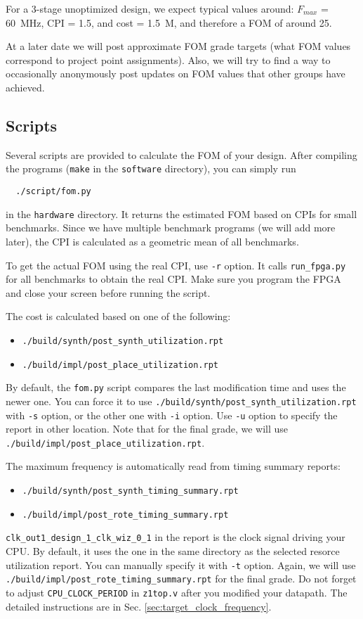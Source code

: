 For a 3-stage unoptimized design, we expect typical values around: $F_{max}$ = 60~MHz, CPI = 1.5, and cost = 1.5~M, and therefore a FOM of around 25.

At a later date we will post approximate FOM grade targets (what FOM values correspond to project point assignments).
Also, we will try to find a way to occasionally anonymously post updates on FOM values that other groups have achieved.


\subsection{Scripts}
Several scripts are provided to calculate the FOM of your design.
After compiling the programs (\verb|make| in the \verb|software| directory),
you can simply run
\begin{verbatim}
  ./script/fom.py
\end{verbatim}
in the \verb|hardware| directory.
It returns the estimated FOM based on CPIs for small benchmarks.
Since we have multiple benchmark programs (we will add more later),
the CPI is calculated as a geometric mean of all benchmarks.

To get the actual FOM using the real CPI, use \verb|-r| option.
It calls \verb|run_fpga.py| for all benchmarks to obtain the real CPI.
Make sure you program the FPGA and close your screen before running the script.

The cost is calculated based on one of the following:
\begin{itemize}
\item \verb|./build/synth/post_synth_utilization.rpt|
\item \verb|./build/impl/post_place_utilization.rpt|
\end{itemize}
By default, the \verb|fom.py| script compares the last modification time and uses the newer one.
You can force it to use \verb|./build/synth/post_synth_utilization.rpt| with \verb|-s| option,
or the other one with \verb|-i| option.
Use \verb|-u| option to specify the report in other location.
Note that for the final grade, we will use \verb|./build/impl/post_place_utilization.rpt|.

The maximum frequency is automatically read from timing summary reports:
\begin{itemize}
\item \verb|./build/synth/post_synth_timing_summary.rpt|
\item \verb|./build/impl/post_rote_timing_summary.rpt|
\end{itemize}
\verb|clk_out1_design_1_clk_wiz_0_1| in the report is the clock signal driving your CPU.
By default, it uses the one in the same directory as the selected resorce utilization report.
You can manually specify it with \verb|-t| option.
Again, we will use \verb|./build/impl/post_rote_timing_summary.rpt| for the final grade.
Do not forget to adjust \verb|CPU_CLOCK_PERIOD| in \verb|z1top.v| after you modified your datapath.
The detailed instructions are in Sec. \ref{sec:target_clock_frequency}.

